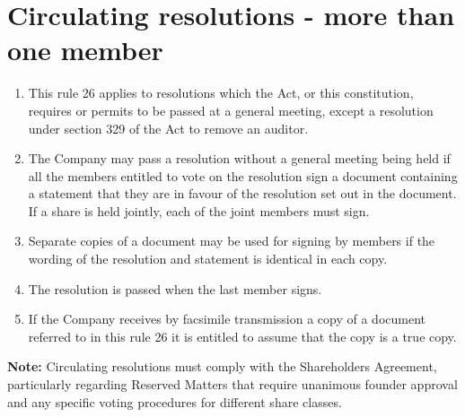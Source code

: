 \section{Circulating resolutions - more than one member}

\begin{enumerate}[label=(\alph*)]
    \item This rule 26 applies to resolutions which the Act, or this constitution, requires or permits to be passed at a general meeting, except a resolution under section 329 of the Act to remove an auditor.
    
    \item The Company may pass a resolution without a general meeting being held if all the members entitled to vote on the resolution sign a document containing a statement that they are in favour of the resolution set out in the document. If a share is held jointly, each of the joint members must sign.
    
    \item Separate copies of a document may be used for signing by members if the wording of the resolution and statement is identical in each copy.
    
    \item The resolution is passed when the last member signs.
    
    \item If the Company receives by facsimile transmission a copy of a document referred to in this rule 26 it is entitled to assume that the copy is a true copy.
\end{enumerate}

\textbf{Note:} Circulating resolutions must comply with the Shareholders Agreement, particularly regarding Reserved Matters that require unanimous founder approval and any specific voting procedures for different share classes. 